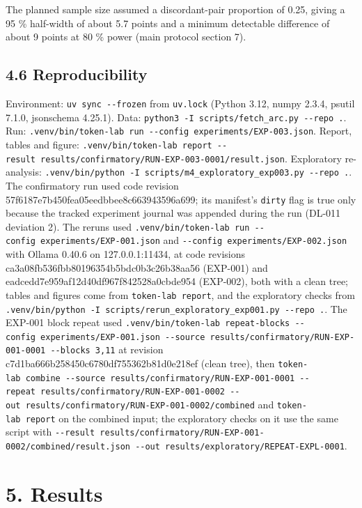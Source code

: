 \documentclass[
]{article}
\begin{document}
The planned sample size assumed a discordant-pair proportion of 0.25,
giving a 95 \% half-width of about 5.7 points and a minimum detectable
difference of about 9 points at 80 \% power (main protocol section 7).

\subsection{4.6 Reproducibility}\label{reproducibility}

Environment: \texttt{uv\ sync\ -\/-frozen} from \texttt{uv.lock} (Python
3.12, numpy 2.3.4, psutil 7.1.0, jsonschema 4.25.1). Data:
\texttt{python3\ -I\ scripts/fetch\_arc.py\ -\/-repo\ .}. Run:
\texttt{.venv/bin/token-lab\ run\ -\/-config\ experiments/EXP-003.json}.
Report, tables and figure:
\texttt{.venv/bin/token-lab\ report\ -\/-result\ results/confirmatory/RUN-EXP-003-0001/result.json}.
Exploratory re-analysis:
\texttt{.venv/bin/python\ -I\ scripts/m4\_exploratory\_exp003.py\ -\/-repo\ .}.
The confirmatory run used code revision
57f6187e7b450fea05eedbbee8c663943596a699; its manifest's \texttt{dirty}
flag is true only because the tracked experiment journal was appended
during the run (DL-011 deviation 2). The reruns used
\texttt{.venv/bin/token-lab\ run\ -\/-config\ experiments/EXP-001.json}
and \texttt{-\/-config\ experiments/EXP-002.json} with Ollama 0.40.6 on
127.0.0.1:11434, at code revisions
ca3a08fb536fbb80196354b5bdc0b3c26b38aa56 (EXP-001) and
eadcedd7e959af12d40df967f842528a0cbde954 (EXP-002), both with a clean
tree; tables and figures come from \texttt{token-lab\ report}, and the
exploratory checks from
\texttt{.venv/bin/python\ -I\ scripts/rerun\_exploratory\_exp001.py\ -\/-repo\ .}.
The EXP-001 block repeat used
\texttt{.venv/bin/token-lab\ repeat-blocks\ -\/-config\ experiments/EXP-001.json\ -\/-source\ results/confirmatory/RUN-EXP-001-0001\ -\/-blocks\ 3,11}
at revision c7d1ba666b258450c6780df755362b81d0e218ef (clean tree), then
\texttt{token-lab\ combine\ -\/-source\ results/confirmatory/RUN-EXP-001-0001\ -\/-repeat\ results/confirmatory/RUN-EXP-001-0002\ -\/-out\ results/confirmatory/RUN-EXP-001-0002/combined}
and \texttt{token-lab\ report} on the combined input; the exploratory
checks on it use the same script with
\texttt{-\/-result\ results/confirmatory/RUN-EXP-001-0002/combined/result.json\ -\/-out\ results/exploratory/REPEAT-EXPL-0001}.

\section{5. Results}\label{results}
\end{document}
